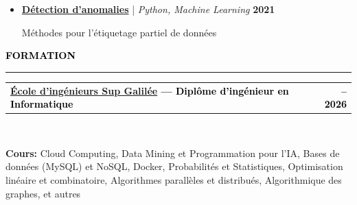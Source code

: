 \documentclass[10pt,english,french]{article}
\makeatletter
\newlength{\mpwidth}
\newcommand{\cvsection}[1]{
    \vspace{4pt}
    \textbf{\fontsize{9pt}{10pt}\selectfont \textcolor{black}{#1}}
    \vspace{6pt}
    \hrule
    \vspace{6pt}
}
\newcommand{\cvtextnotab}[1]{
    \parbox{1\mpwidth}{#1}
}
\newcommand{\cvevent}[2]{
    \vspace{2pt}
    \parbox{\mpwidth}{
        \begin{tabular*}{1\mpwidth}{@{\extracolsep{\fill}} l r}
            \textcolor{black}{\textbf{\fontsize{11}{12}\selectfont #1}} & \textcolor{black}{\textbf{\fontsize{12}{12}\selectfont #2}} \\
        \end{tabular*}\\[-8pt] %
    }
}
\newcommand{\cvsubevent}[2]{
    \parbox{\mpwidth}{
        \begin{tabular*}{1\mpwidth}{@{\extracolsep{\fill}} l r}
            \textcolor{black}{\textit{\fontsize{10}{12}\selectfont #1}} & \textcolor{black}{\textit{\fontsize{10}{12}\selectfont #2}} \\
        \end{tabular*}\\[-8pt] %
    }
    \vspace{-10pt}
}
\makeatother
\begin{document}
\begin{itemize}[leftmargin=0.5cm, label=\textbullet, itemsep=0.2em]
    \item \href{https://github.com/DmytroPalahin/Anomaly_Detection}{\textbf{Détection d'anomalies}} | \textit{Python, Machine Learning} \hfill \textbf{2021}

          Méthodes pour l'étiquetage partiel de données


\end{itemize}

\vspace{-6pt}
\cvsection{FORMATION}

\vspace{-3pt}
\cvevent{\href{https://www.sup-galilee.univ-paris13.fr/}{École d'ingénieurs Sup Galilée} --- Diplôme d'ingénieur en Informatique}{\fontsize{11pt}{11pt}\selectfont 2023\hspace{5pt}--\hspace{5pt}2026}

\vspace{-3pt}
\cvtextnotab{\textbf{Cours\!:} Cloud Computing, Data Mining et Programmation pour l'IA, Bases de données (MySQL) et NoSQL, Docker, Probabilités et Statistiques, Optimisation linéaire et combinatoire, Algorithmes parallèles et distribués, Algorithmique des graphes, et autres}

\vspace{-10pt}
\noindent{\textcolor{middle_light_gray}{\rule{\mpwidth}{0.2pt}}}
\vspace{-15pt}
\end{document}
